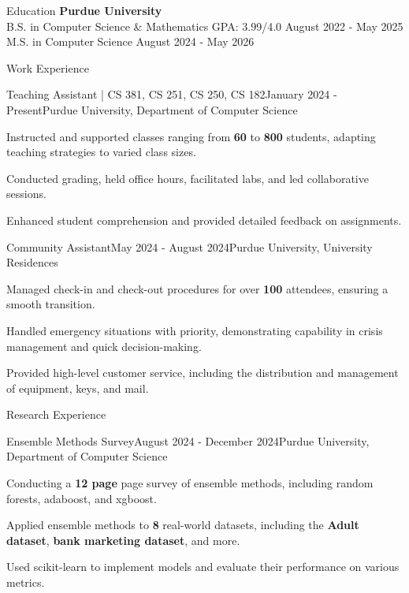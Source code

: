 \documentclass[
    11pt, %
]{resume} %
\begin{document}
\small

\vspace*{-0.3cm}
\begin{rSection}{Education}
\vspace*{-0.3cm}
    \textbf{Purdue University} \\
    B.S. in Computer Science \& Mathematics \hfill GPA: 3.99/4.0 \quad August 2022 - May 2025 \\
    M.S. in Computer Science \hfill August 2024 - May 2026 \\
\end{rSection}
\vspace*{-0.3cm}
\begin{rSection}{Work Experience}
\vspace*{-0.2cm}
    \begin{rSubsection}{Teaching Assistant | CS 381, CS 251, CS 250, CS 182}{January 2024 - Present}{Purdue University, Department of Computer Science}{}
        \item Instructed and supported classes ranging from \textbf{60} to \textbf{800} students, adapting teaching strategies to varied class sizes.
        \item Conducted grading, held office hours, facilitated labs, and led collaborative sessions.
        \item Enhanced student comprehension and provided detailed feedback on assignments.
    \end{rSubsection}
    \vspace*{0,3cm}
    
\begin{rSubsection}{Community Assistant}{May 2024 - August 2024}{Purdue University, University Residences}{}
    \item Managed check-in and check-out procedures for over \textbf{100} attendees, ensuring a smooth transition.
    \item Handled emergency situations with priority, demonstrating capability in crisis management and quick decision-making.
    \item Provided high-level customer service, including the distribution and management of equipment, keys, and mail.
\end{rSubsection}

\end{rSection}


\vspace*{-0.3cm}
\begin{rSection}{Research Experience}
  \begin{rSubsection}{Ensemble Methods Survey}{August 2024 - December 2024}{Purdue University, Department of Computer Science}{}
  \item Conducting a \textbf{12 page} page survey of ensemble methods, including random forests, adaboost, and xgboost.
  \item Applied ensemble methods to \textbf{8} real-world datasets, including the \textbf{Adult dataset}, \textbf{bank marketing dataset}, and more.
  \item Used scikit-learn to implement models and evaluate their performance on various metrics.
  \end{rSubsection}
\end{rSection}
\end{document}

